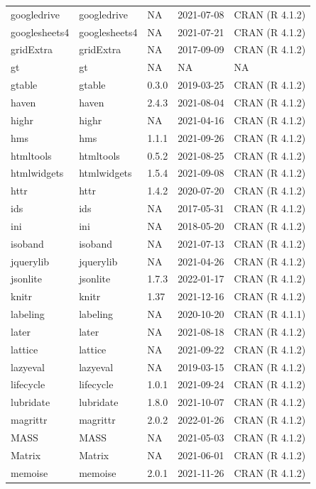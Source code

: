 \begin{tabular}{lllll}
googledrive & googledrive & NA & 2021-07-08 & CRAN (R 4.1.2)\\
googlesheets4 & googlesheets4 & NA & 2021-07-21 & CRAN (R 4.1.2)\\
\addlinespace
gridExtra & gridExtra & NA & 2017-09-09 & CRAN (R 4.1.2)\\
gt & gt & NA & NA & NA\\
gtable & gtable & 0.3.0 & 2019-03-25 & CRAN (R 4.1.2)\\
haven & haven & 2.4.3 & 2021-08-04 & CRAN (R 4.1.2)\\
highr & highr & NA & 2021-04-16 & CRAN (R 4.1.2)\\
\addlinespace
hms & hms & 1.1.1 & 2021-09-26 & CRAN (R 4.1.2)\\
htmltools & htmltools & 0.5.2 & 2021-08-25 & CRAN (R 4.1.2)\\
htmlwidgets & htmlwidgets & 1.5.4 & 2021-09-08 & CRAN (R 4.1.2)\\
httr & httr & 1.4.2 & 2020-07-20 & CRAN (R 4.1.2)\\
ids & ids & NA & 2017-05-31 & CRAN (R 4.1.2)\\
\addlinespace
ini & ini & NA & 2018-05-20 & CRAN (R 4.1.2)\\
isoband & isoband & NA & 2021-07-13 & CRAN (R 4.1.2)\\
jquerylib & jquerylib & NA & 2021-04-26 & CRAN (R 4.1.2)\\
jsonlite & jsonlite & 1.7.3 & 2022-01-17 & CRAN (R 4.1.2)\\
knitr & knitr & 1.37 & 2021-12-16 & CRAN (R 4.1.2)\\
\addlinespace
labeling & labeling & NA & 2020-10-20 & CRAN (R 4.1.1)\\
later & later & NA & 2021-08-18 & CRAN (R 4.1.2)\\
lattice & lattice & NA & 2021-09-22 & CRAN (R 4.1.2)\\
lazyeval & lazyeval & NA & 2019-03-15 & CRAN (R 4.1.2)\\
lifecycle & lifecycle & 1.0.1 & 2021-09-24 & CRAN (R 4.1.2)\\
\addlinespace
lubridate & lubridate & 1.8.0 & 2021-10-07 & CRAN (R 4.1.2)\\
magrittr & magrittr & 2.0.2 & 2022-01-26 & CRAN (R 4.1.2)\\
MASS & MASS & NA & 2021-05-03 & CRAN (R 4.1.2)\\
Matrix & Matrix & NA & 2021-06-01 & CRAN (R 4.1.2)\\
memoise & memoise & 2.0.1 & 2021-11-26 & CRAN (R 4.1.2)\\

\end{tabular}
